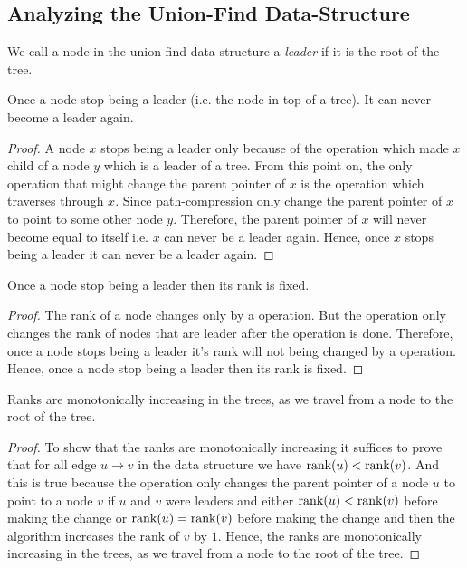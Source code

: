 \subsection{Analyzing the Union-Find Data-Structure}\label{analysis-union-find}
We call a node in the union-find data-structure a \emph{leader} if it is the root of the tree.
\begin{lemma}{}{}
	Once a node stop being a {leader} (i.e. the node in top of a tree). It can never become a leader again.
\end{lemma}
\begin{proof}
	A node $x$ stops being a {leader} only because of the  operation which made $x$ child of a node $y$ which is a {leader} of a tree. From this point on, the only operation that might change the parent pointer of $x$ is the  operation which traverses through $x$. Since path-compression only change the parent pointer of $x$ to point to some other node $y$. Therefore, the parent pointer of $x$ will never become equal to itself i.e. $x$ can never be a {leader} again. Hence, once $x$ stops being a {leader} it can never be a {leader} again.
\end{proof}
\begin{lemma}{}{}
	Once a node stop being a leader then its rank is fixed.
\end{lemma}
\begin{proof}
	The rank of a node changes only by a  operation. But the  operation only changes the rank of nodes that are {leader} after the operation is done. Therefore, once a node stops being a {leader} it's rank will not being changed by a  operation. Hence, once a node stop being a leader then its rank is fixed.
\end{proof}
\begin{lemma}{}{}
	Ranks are monotonically increasing in the trees, as we travel from a node to the root of the tree.
\end{lemma}
\begin{proof}
	To show that the ranks are monotonically increasing  it suffices to prove that for all edge $u\to v$ in the data structure we have $\operatorname{rank}(u)<\operatorname{rank}(v)$. And this is true because the  operation only changes the parent pointer of a node $u$ to point to a node $v$ if $u$ and $v$ were leaders and either $\operatorname{rank}(u)<\operatorname{rank}(v)$ before making the change or $\operatorname{rank}(u)=\operatorname{rank}(v)$ before making the change and then the algorithm increases the rank of $v$ by $1$. Hence, the ranks are monotonically increasing in the trees, as we travel from a node to the root of the tree.
\end{proof}

